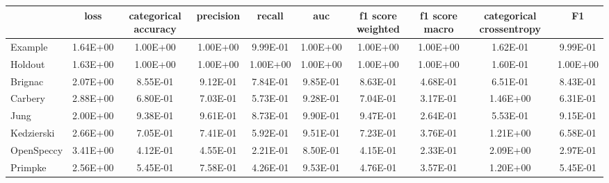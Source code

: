 \begin{tabular}{lccccccccc}
\toprule
 & loss & categorical accuracy & precision & recall & auc & f1 score weighted & f1 score macro & categorical crossentropy & F1 \\
\midrule
Example & 1.64E+00 & 1.00E+00 & 1.00E+00 & 9.99E-01 & 1.00E+00 & 1.00E+00 & 1.00E+00 & 1.62E-01 & 9.99E-01 \\
Holdout & 1.63E+00 & 1.00E+00 & 1.00E+00 & 1.00E+00 & 1.00E+00 & 1.00E+00 & 1.00E+00 & 1.60E-01 & 1.00E+00 \\
Brignac & 2.07E+00 & 8.55E-01 & 9.12E-01 & 7.84E-01 & 9.85E-01 & 8.63E-01 & 4.68E-01 & 6.51E-01 & 8.43E-01 \\
Carbery & 2.88E+00 & 6.80E-01 & 7.03E-01 & 5.73E-01 & 9.28E-01 & 7.04E-01 & 3.17E-01 & 1.46E+00 & 6.31E-01 \\
Jung & 2.00E+00 & 9.38E-01 & 9.61E-01 & 8.73E-01 & 9.90E-01 & 9.47E-01 & 2.64E-01 & 5.53E-01 & 9.15E-01 \\
Kedzierski & 2.66E+00 & 7.05E-01 & 7.41E-01 & 5.92E-01 & 9.51E-01 & 7.23E-01 & 3.76E-01 & 1.21E+00 & 6.58E-01 \\
OpenSpeccy & 3.41E+00 & 4.12E-01 & 4.55E-01 & 2.21E-01 & 8.50E-01 & 4.15E-01 & 2.33E-01 & 2.09E+00 & 2.97E-01 \\
Primpke & 2.56E+00 & 5.45E-01 & 7.58E-01 & 4.26E-01 & 9.53E-01 & 4.76E-01 & 3.57E-01 & 1.20E+00 & 5.45E-01 \\
\bottomrule
\end{tabular}
